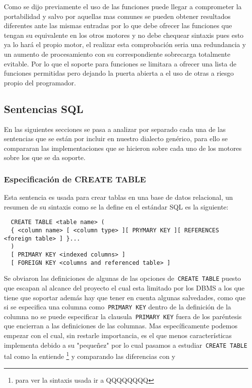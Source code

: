 Como se dijo previamente el uso de las funciones puede llegar a comprometer la portabilidad y salvo por aquellas mas comunes se pueden obtener resultados diferentes ante las mismas entradas por lo que \jj debe ofrecer las funciones que tengan su equivalente en los otros motores y no debe chequear sintaxis pues esto ya lo hará el propio motor, el realizar esta comprobación seria una redundancia y un aumento de procesamiento con su correspondiente sobrecarga totalmente evitable. Por lo que el soporte para funciones se limitara a ofrecer una lista de funciones permitidas pero dejando la puerta abierta a el uso de otras a riesgo propio del programador.


\subsection{Sentencias SQL}
En las siguientes secciones se pasa a analizar por separado cada una de las sentencias que se están por incluir en nuestro dialecto genérico, para ello se compararan las implementaciones que se hicieron sobre cada uno de los motores sobre los que se da soporte.

\subsubsection{Especificación de CREATE TABLE} 
\label{especificacion:dialectos:create}
Esta sentencia es usada para crear tablas en una base de datos relacional, un resumen de su sintaxis como se la define en el estándar SQL es la siguiente:
\begin{Verbatim}
  CREATE TABLE <table name> (
  { <column name> [ <column type> ][ PRYMARY KEY ][ REFERENCES <foreign table> ] }...
  )
  [ PRIMARY KEY <indexed columns> ]
  [ FOREIGN KEY <columns and referenced table> ]
\end{Verbatim}
Se obviaron las definiciones de algunas de las opciones de\verb= CREATE TABLE= puesto que escapan al alcance del proyecto el cual esta limitado por los DBMS a los que tiene que soportar además hay que tener en cuenta algunas salvedades, como que si se especifica una columna como\verb= PRIMARY KEY= dentro de la definición de la columna no se puede especificar la clausula\verb= PRIMARY KEY= fuera de los paréntesis que encierran a las definiciones de las columnas. Mas específicamente podemos empezar con \s el cual, sin restarle importancia, es el que menos características implementa debido a su "pequeñez" por lo cual pasamos a estudiar\verb= CREATE TABLE= tal como la entiende \s\cite{sqlite:sql}\footnote{para ver la sintaxis usada ir a QQQQQQQQ} y comparando las diferencias con \m\citep{mysql:sql} y \p\citep{postgre:sql}

